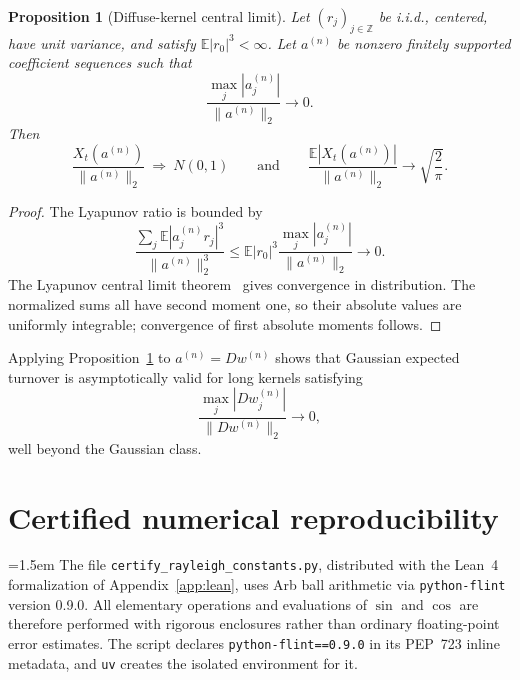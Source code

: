 \documentclass[11pt]{amsart}
\newtheorem{proposition}[theorem]{Proposition}
\theoremstyle{definition}
\theoremstyle{remark}
\begin{document}
\begin{proposition}[Diffuse-kernel central limit]\label{prop:diffuse-clt}
Let $(r_j)_{j\in\mathbb Z}$ be i.i.d., centered, have unit variance, and satisfy
$\mathbb E|r_0|^3<\infty$. Let $a^{(n)}$ be nonzero finitely supported
coefficient sequences such that
\[
 \frac{\max_j|a_j^{(n)}|}{\|a^{(n)}\|_2}\longrightarrow0.
\]
Then
\[
 \frac{X_t(a^{(n)})}{\|a^{(n)}\|_2}\ \Longrightarrow\ N(0,1)
 \qquad\text{and}\qquad
 \frac{\mathbb E|X_t(a^{(n)})|}{\|a^{(n)}\|_2}
 \longrightarrow\sqrt{\frac2\pi}.
\]
\end{proposition}
\begin{proof}
The Lyapunov ratio is bounded by
\[
 \frac{\sum_j\mathbb E|a_j^{(n)}r_j|^3}{\|a^{(n)}\|_2^3}
 \leq\mathbb E|r_0|^3
 \frac{\max_j|a_j^{(n)}|}{\|a^{(n)}\|_2}
 \longrightarrow0.
\]
The Lyapunov central limit theorem~\cite{Billingsley} gives convergence in distribution. The
normalized sums all have second moment one, so their absolute values are
uniformly integrable; convergence of first absolute moments follows.
\end{proof}

Applying Proposition~\ref{prop:diffuse-clt} to $a^{(n)}=Dw^{(n)}$ shows that
Gaussian expected turnover is asymptotically valid for long kernels satisfying
\[
 \frac{\max_j|Dw_j^{(n)}|}{\|Dw^{(n)}\|_2}\to0,
\]
well beyond the Gaussian class.

\section{Certified numerical reproducibility}\label{app:certificate}
\begingroup\emergencystretch=1.5em
The file \texttt{certify\_rayleigh\_constants.py}, distributed with the
Lean~4 formalization of Appendix~\ref{app:lean}, uses Arb ball arithmetic via
\texttt{python-flint} version 0.9.0. All
elementary operations and evaluations of $\sin$ and $\cos$ are therefore
performed with rigorous enclosures rather than ordinary floating-point error
estimates. The script declares \texttt{python-flint==0.9.0} in its PEP~723 inline
metadata, and \texttt{uv} creates the isolated environment for it.
\par\endgroup
\end{document}

